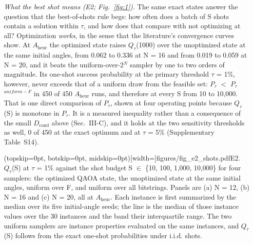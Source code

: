 \documentclass{ieeeaccess}
\begin{document}
\textit{What the best shot means (E2; Fig.~\ref{fig:1}).} The same exact states answer the question that the best-of-shots rule begs: how often does a batch of S shots contain a solution within $\tau$, and how does that compare with not optimizing at all? Optimization \textit{works}, in the sense that the literature's convergence curves show. At $A_{\mathrm{heur}}$ the optimized state raises $Q_{\tau}$(1000) over the unoptimized state at the same initial angles, from 0.062 to 0.336 at N = 16 and from 0.019 to 0.059 at N = 20, and it beats the uniform-over-2$^{N}$ sampler by one to two orders of magnitude. Its one-shot success probability at the primary threshold $\tau$ = 1\%, however, never exceeds that of a uniform draw from the feasible set: $P_{\tau}$ $<$ $P_{\tau}$$^{uniform-F}$ in 450 of 450 $A_{\mathrm{heur}}$ runs, and therefore at every S from 10 to 10,000. That is one direct comparison of $P_{\tau}$, shown at four operating points because $Q_{\tau}$(S) is monotone in $P_{\tau}$. It is a measured inequality rather than a consequence of the small $D_{\mathrm{cond}}$ above (Sec.~III-C), and it holds at the two sensitivity thresholds as well, 0 of 450 at the exact optimum and at $\tau$ = 5\% (Supplementary Table~S14).

\Figure[!t](topskip=0pt, botskip=0pt, midskip=0pt)[width=\textwidth]{figures/fig_e2_shots.pdf}{E2. $Q_{\tau}$(S) at $\tau$ = 1\% against the shot budget S $\in$ \{10, 100, 1,000, 10,000\} for four samplers: the optimized QAOA state, the unoptimized state at the same initial angles, uniform over F, and uniform over all bitstrings. Panels are (a) N = 12, (b) N = 16 and (c) N = 20, all at $A_{\mathrm{heur}}$. Each instance is first summarized by the median over its five initial-angle seeds; the line is the median of those instance values over the 30 instances and the band their interquartile range. The two uniform samplers are instance properties evaluated on the same instances, and $Q_{\tau}$(S) follows from the exact one-shot probabilities under i.i.d. shots.\label{fig:1}}
\end{document}
